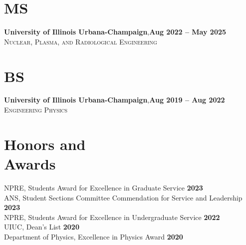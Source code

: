 \documentclass[margin,line]{resume}
\begin{document}
\begin{resume}
    \section{\mysidestyle MS}
    \textbf{University of Illinois Urbana-Champaign},\hfill\textbf{Aug 2022 -- May 2025}\\
    \textsc{Nuclear, Plasma, and Radiological Engineering}\vspace{-2mm}
    \section{\mysidestyle BS}
    \textbf{University of Illinois Urbana-Champaign},\hfill\textbf{Aug 2019 -- Aug 2022}\\
    \textsc{Engineering Physics}\vspace{-3mm}

    \section{\mysidestyle Honors and\\Awards}
                NPRE, Students Award for Excellence in Graduate Service \hfill \textbf{2023}\vspace{.5mm}\\%
                ANS, Student Sections Committee Commendation for Service and Leadership \hfill \textbf{2023}\vspace{.5mm}\\%
                NPRE, Students Award for Excellence in Undergraduate Service \hfill \textbf{2022}\vspace{.5mm}\\%
                UIUC, Dean's List \hfill \textbf{2020}\vspace{.5mm}\\%
                Department of Physics, Excellence in Physics Award \hfill \textbf{2020}\vspace{.5mm}\\%



\end{resume}
\end{document}
